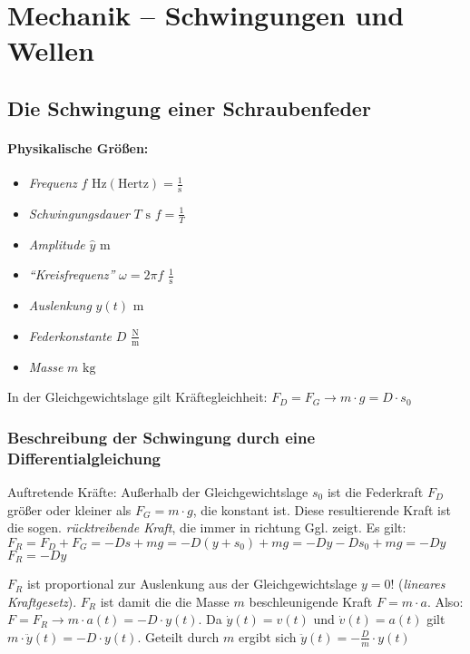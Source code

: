 \documentclass[a4paper]{scrartcl}
\begin{document}
\section{Mechanik -- Schwingungen und Wellen}
\subsection{Die Schwingung einer Schraubenfeder}
\paragraph{Physikalische Größen:} \begin{itemize}
	\item \emph{Frequenz} $f$ $\mathrm{Hz (Hertz)} = \frac{1}{\mathrm{s}}$
	\item \emph{Schwingungsdauer} $T$ $\mathrm{s}$ $f = \frac{1}{T}$
	\item \emph{Amplitude} $\hat{y}$ $\mathrm{m}$
	\item \emph{"`Kreisfrequenz"'} $\omega = 2 \pi f$ $\frac{1}{\mathrm{s}}$
	\item \emph{Auslenkung} $y(t)$ $\mathrm{m}$
	\item \emph{Federkonstante} $D$ $\frac{\mathrm{N}}{\mathrm{m}}$
	\item \emph{Masse} $m$ $\mathrm{kg}$
\end{itemize}
In der Gleichgewichtslage gilt Kräftegleichheit: $F_D = F_G \rightarrow m \cdot
g = D \cdot s_0$

\subsubsection{Beschreibung der Schwingung durch eine Differentialgleichung}
Auftretende Kräfte: Außerhalb der Gleichgewichtslage $s_0$ ist die Federkraft
$F_D$ größer oder kleiner als $F_G = m \cdot g$, die konstant ist. Diese
resultierende Kraft ist die sogen. \emph{rücktreibende Kraft}, die immer in
richtung Ggl. zeigt. Es gilt: $F_R = F_D + F_G = -Ds + mg = -D(y+s_0) + mg =
-Dy-Ds_0 + mg = -Dy$ $F_R = -Dy$ %

$F_R$ ist proportional zur Auslenkung aus der Gleichgewichtslage $y=0$!
(\emph{lineares Kraftgesetz}).
$F_R$ ist damit die die Masse $m$ beschleunigende Kraft $F=m \cdot a$. Also: $F
= F_R \rightarrow m \cdot a(t) = -D \cdot y(t)$. Da $\dot{y}(t) = v(t)$ und
$\dot{v}(t) = a(t)$ gilt $m \cdot \ddot{y}(t) = -D \cdot y(t)$. Geteilt durch
$m$ ergibt sich $\ddot{y}(t) = -\frac{D}{m} \cdot y(t)$
\end{document}
